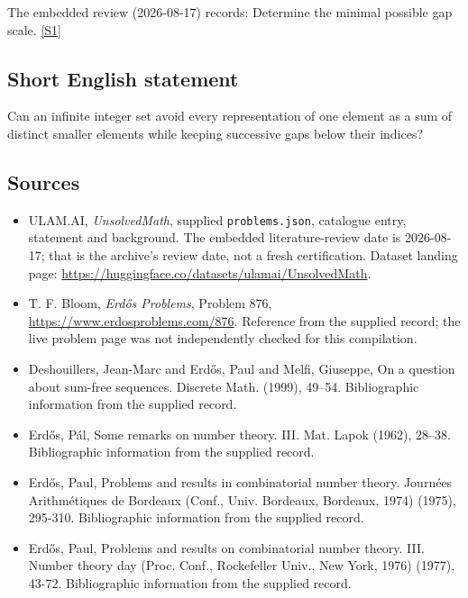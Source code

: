 \documentclass[11pt,a4paper]{article}
\newcommand{\sref}[2]{\hyperlink{source:#1:#2}{[S#2]}}
\begin{document}
The embedded review (2026-08-17) records: Determine the minimal possible gap scale. \sref{statement}{1}

\subsection{Short English statement}

Can an infinite integer set avoid every representation of one element as a sum of distinct smaller elements while keeping successive gaps below their indices?

\subsection{Sources}

{\small

\begin{itemize}

\item[\hypertarget{source:statement:1}{S1}] ULAM.AI, \emph{UnsolvedMath}, supplied \texttt{problems.json}, catalogue entry, statement and background. The embedded literature-review date is 2026-08-17; that is the archive’s review date, not a fresh certification. Dataset landing page: \url{https://huggingface.co/datasets/ulamai/UnsolvedMath}.

\item[\hypertarget{source:statement:2}{S2}] T. F. Bloom, \emph{Erdős Problems}, Problem 876, \url{https://www.erdosproblems.com/876}. Reference from the supplied record; the live problem page was not independently checked for this compilation.

\item[\hypertarget{source:statement:3}{S3}] Deshouillers, Jean-Marc and Erd\H{o}s, Paul and Melfi, Giuseppe, On a question about sum-free sequences. Discrete Math. (1999), 49--54. Bibliographic information from the supplied record.

\item[\hypertarget{source:statement:4}{S4}] Erd\H{o}s, P\'{a}l, Some remarks on number theory. {III}. Mat. Lapok (1962), 28--38. Bibliographic information from the supplied record.

\item[\hypertarget{source:statement:5}{S5}] Erd\H{o}s, Paul, Problems and results in combinatorial number theory. Journ\'{e}es Arithm\'{e}tiques de Bordeaux (Conf., Univ. Bordeaux, Bordeaux, 1974) (1975), 295-310. Bibliographic information from the supplied record.

\item[\hypertarget{source:statement:6}{S6}] Erd\H{o}s, Paul, Problems and results on combinatorial number theory. III. Number theory day (Proc. Conf., Rockefeller Univ., New York, 1976) (1977), 43-72. Bibliographic information from the supplied record.

\end{itemize}

}

\label{end:statement}
\end{document}
